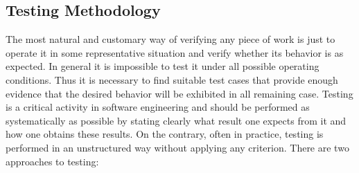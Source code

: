 \documentclass[12pt]{article}
\begin{document}
\subsection{Testing Methodology}
The most natural and customary way of verifying any piece of work is just to operate
it in some representative situation and verify whether its behavior is as expected. In
general it is impossible to test it under all possible operating conditions. Thus it
is necessary to find suitable test cases that provide enough evidence that the desired
behavior will be exhibited in all remaining case. Testing is a critical activity in software
engineering and should be performed as systematically as possible by stating clearly
what result one expects from it and how one obtains these results. On the contrary,
often in practice, testing is performed in an unstructured way without applying any
criterion. There are two approaches to testing:
\end{document}
